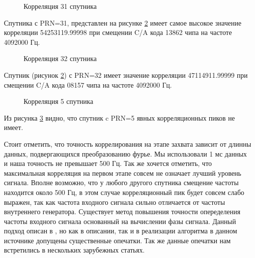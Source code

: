 \documentclass[a4paper,12pt]{article}
\numberwithin{table}{section}
\begin{document}
\begin{figure}[h]
\begin{center}
\end{center}
\caption{Корреляция 31 спутника}
\label{pic:corr_31}
\end{figure}
Спутника с PRN=31, представлен на рисунке \ref{pic:corr_32} имеет самое высокое значение корреляции
54253119.99998 при смещении C/A кода 13862 чипа на частоте 4092000 Гц.

\begin{figure}[h]
\begin{center}
\end{center}
\caption{Корреляция 32 спутника}
\label{pic:corr_32}
\end{figure}
Спутник (рисунок \ref{pic:corr_32}) с PRN=32 имеет значение корреляции 47114911.99999 при
смещении C/A кода 08157 чипа на частоте 4092000 Гц.

\begin{figure}[h]
\begin{center}
\end{center}
\caption{Корреляция 5 спутника}
\label{pic:corr_5}
\end{figure}
Из рисунка \ref{pic:corr_5} видно, что спутник c PRN=5 явных корреляционных пиков не имеет.

Стоит отметить, что точность коррелирования на этапе захвата зависит от длинны данных, подвергающихся преобразованию фурье.
Мы использовали 1 мс данных и наша точность не превышает 500 Гц. Так же хочется отметить, что максимальная корреляция на 
первом этапе совсем не означает лучший уровень сигнала. Вполне возможно, что у любого другого спутника смещение частоты
находится около 500 Гц, в этом случае корреляционный пик будет совсем слабо выражен, так как частота входного сигнала
сильно отличается от частоты внутреннего генератора. Существует метод повышения точности опеределения частоты
входного сигнала основанный на вычислении фазы сигнала. Данный подход описан в \cite{tsui}, но как в описании, так и в
реализации алгоритма в данном источнике допущены существенные опечатки. Так же данные опечатки нам встретились 
в нескольких зарубежных статьях.
\end{document}
